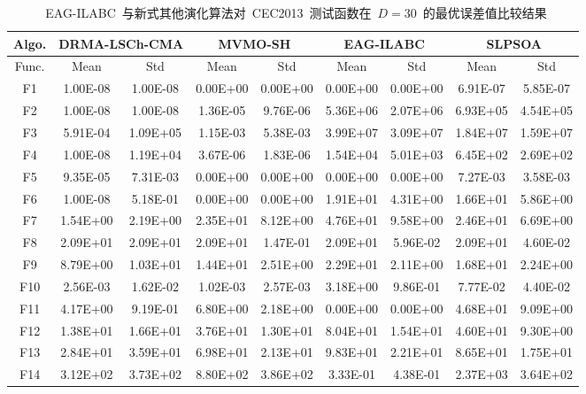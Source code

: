 \begin{table*}[htbp]
  \centering
  \caption{~EAG-ILABC~与新式其他演化算法对~CEC2013~测试函数在~$D=30$~的最优误差值比较结果}
  \scriptsize
    \begin{tabular}{|c|cc|cc|cc|cc|}
    \hline
    Algo. & \multicolumn{2}{c|}{DRMA-LSCh-CMA} & \multicolumn{2}{c|}{MVMO-SH} & \multicolumn{2}{c|}{EAG-ILABC} & \multicolumn{2}{c|}{SLPSOA} \\
    \hline
    Func. & Mean  & Std   & Mean  & Std   & Mean  & Std   & Mean & Std \\
    \hline
    F1    & 1.00E-08 & 1.00E-08 & 0.00E+00 & 0.00E+00 & 0.00E+00 & 0.00E+00 & 6.91E-07 & 5.85E-07 \\
    F2    & 1.00E-08 & 1.00E-08 & 1.36E-05 & 9.76E-06 & 5.36E+06 & 2.07E+06 & 6.93E+05 & 4.54E+05 \\
    F3    & 5.91E-04 & 1.09E+05 & 1.15E-03 & 5.38E-03 & 3.99E+07 & 3.09E+07 & 1.84E+07 & 1.59E+07 \\
    F4    & 1.00E-08 & 1.19E+04 & 3.67E-06 & 1.83E-06 & 1.54E+04 & 5.01E+03 & 6.45E+02 & 2.69E+02 \\
    F5    & 9.35E-05 & 7.31E-03 & 0.00E+00 & 0.00E+00 & 0.00E+00 & 0.00E+00 & 7.27E-03 & 3.58E-03 \\
    \hline
    F6    & 1.00E-08 & 5.18E-01 & 0.00E+00 & 0.00E+00 & 1.91E+01 & 4.31E+00 & 1.66E+01 & 5.86E+00 \\
    F7    & 1.54E+00 & 2.19E+00 & 2.35E+01 & 8.12E+00 & 4.76E+01 & 9.58E+00 & 2.46E+01 & 6.69E+00 \\
    F8    & 2.09E+01 & 2.09E+01 & 2.09E+01 & 1.47E-01 & 2.09E+01 & 5.96E-02 & 2.09E+01 & 4.60E-02 \\
    F9    & 8.79E+00 & 1.03E+01 & 1.44E+01 & 2.51E+00 & 2.29E+01 & 2.11E+00 & 1.68E+01 & 2.24E+00 \\
    F10   & 2.56E-03 & 1.62E-02 & 1.02E-03 & 2.57E-03 & 3.18E+00 & 9.86E-01 & 7.77E-02 & 4.40E-02 \\
    F11   & 4.17E+00 & 9.19E-01 & 6.80E+00 & 2.18E+00 & 0.00E+00 & 0.00E+00 & 4.68E+01 & 9.09E+00 \\
    F12   & 1.38E+01 & 1.66E+01 & 3.76E+01 & 1.30E+01 & 8.04E+01 & 1.54E+01 & 4.60E+01 & 9.30E+00 \\
    F13   & 2.84E+01 & 3.59E+01 & 6.98E+01 & 2.13E+01 & 9.83E+01 & 2.21E+01 & 8.65E+01 & 1.75E+01 \\
    F14   & 3.12E+02 & 3.73E+02 & 8.80E+02 & 3.86E+02 & 3.33E-01 & 4.38E-01 & 2.37E+03 & 3.64E+02 \\

\end{tabular}
\end{table*}
